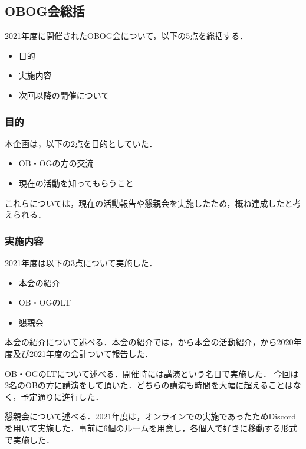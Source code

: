 \subsection*{OBOG会総括}


2021年度に開催されたOBOG会について，以下の5点を総括する．
\begin{itemize}
    \item 目的
    \item 実施内容
    \item 次回以降の開催について
\end{itemize}

\subsubsection*{目的}

本企画は，以下の2点を目的としていた．

\begin{itemize}
    \item OB・OGの方の交流
    \item 現在の活動を知ってもらうこと
\end{itemize}

これらについては，現在の活動報告や懇親会を実施したため，概ね達成したと考えられる．

\subsubsection*{実施内容}

2021年度は以下の3点について実施した．

\begin{itemize}
    \item 本会の紹介
    \item OB・OGのLT
	\item 懇親会
\end{itemize}

本会の紹介について述べる．本会の紹介では，\president{}から本会の活動紹介，\kaikeiChief{}から2020年度及び2021年度の会計ついて報告した．

OB・OGのLTについて述べる．開催時には講演という名目で実施した．
今回は2名のOBの方に講演をして頂いた．どちらの講演も時間を大幅に超えることはなく，予定通りに進行した．

懇親会について述べる．2021年度は，オンラインでの実施であったためDiscordを用いて実施した．事前に6個のルームを用意し，各個人で好きに移動する形式で実施した．
